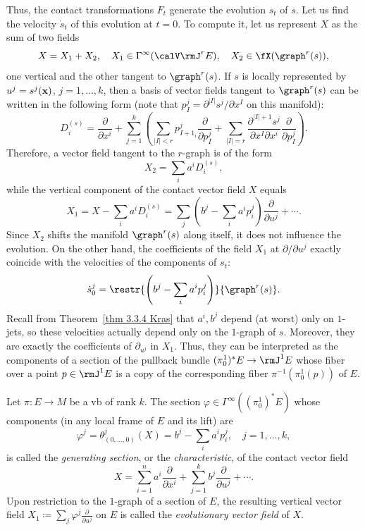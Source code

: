 Thus, the contact transformations $F_t$ generate the evolution $s_t$ of $s$. Let us find the velocity $\dot s_t$ of this evolution at $t=0$. To compute it, let us represent $X$ as the sum of two fields
\[X=X_1+X_2,\quad X_1\in\Gamma^\infty(\calV\rmJ^r E),\quad X_2\in\fX(\graph^r(s)),\]
one vertical and the other tangent to $\graph^r(s)$. If $s$ is locally represented by $u^j=s^j(\bf{x})$, $j=1,\ldots,k$, then a basis of vector fields tangent to $\graph^r(s)$ can be written in the following form (note that $p^j_I=\partial^{|I|}s^j/\partial x^I$ on this manifold):
\[D_i^{(s)}=\frac{\partial}{\partial x^i}+\sum_{j=1}^k \left(\sum_{|I|< r}p^j_{I+1_i}\frac{\partial}{\partial p^j_I}+\sum_{|I|=r}\frac{\partial^{|I|+1}s^j}{\partial x^I\partial x^i}\frac{\partial}{\partial p^j_I}\right).\]
Therefore, a vector field tangent to the $r$-graph is of the form 
\[X_2=\sum_i a^i D_i^{(s)},\]
while the vertical component of the contact vector field $X$ equals 
\[X_1=X-\sum_i a^i D_i^{(s)}=\sum_j\left(b^j-\sum_i a^ip^j_i\right)\frac{\partial}{\partial u^j}+\cdots.\]
Since $X_2$ shifts the manifold $\graph^r(s)$ along itself, it does not influence the evolution. On the other hand, the coefficients of the field $X_1$ at $\partial/\partial u^j$ exactly coincide with the velocities of the components of $s_t$:
\[\dot s^j_0=\restr{\left(b^j-\sum_i a^i p^j_i\right)}{\graph^r(s)}.\]
Recall from Theorem~\ref{thm 3.3.4 Kras} that $a^i,b^j$ depend (at worst) only on $1$-jets, so these velocities actually depend only on the $1$-graph of $s$. Moreover, they are exactly the coefficients of $\partial_{u^j}$ in $X_1$. Thus, they can be interpreted as the components of a section of the pullback bundle $(\pi^1_0)^\ast E\to \rmJ^1 E$ whose fiber over a point $p\in \rmJ^1 E$ is a copy of the corresponding fiber $\pi^{-1}(\pi^1_0(p))$ of $E$. 

\begin{defn}
    Let $\pi:E\to M$ be a \gls{vb} of rank $k$. The section $\varphi\in\Gamma^\infty((\pi^1_0)^\ast E)$ whose components (in any local frame of $E$ and its lift) are 
    \[\varphi^j=\theta^j_{(0,\ldots,0)}(X)=b^j-\sum_i a^ip^j_i,\quad j=1,\ldots,k,\]
    is called the \emph{generating section}, or the \emph{characteristic}, of the contact vector field 
    \[X=\sum_{i=1}^n a^i \frac{\partial}{\partial x^i}+\sum_{j=1}^k b^j\frac{\partial}{\partial u^j}+\cdots.\]
    Upon restriction to the $1$-graph of a section of $E$, the resulting vertical vector field $X_1\coloneqq \sum_j \varphi^j \frac{\partial}{\partial u^j}$ on $E$ is called the \emph{evolutionary vector field} of $X$.
\end{defn}

